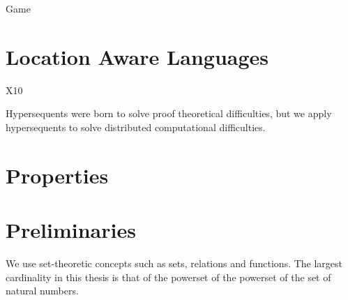 Game

\section{Location Aware Languages}

X10


Hypersequents were born to solve proof theoretical difficulties, but we
apply hypersequents to solve distributed computational difficulties.

\section{Properties}


\section{Preliminaries}

We use set-theoretic concepts such as sets, relations and functions.
The largest cardinality in this thesis is that of the
powerset of the powerset of the set of natural numbers.